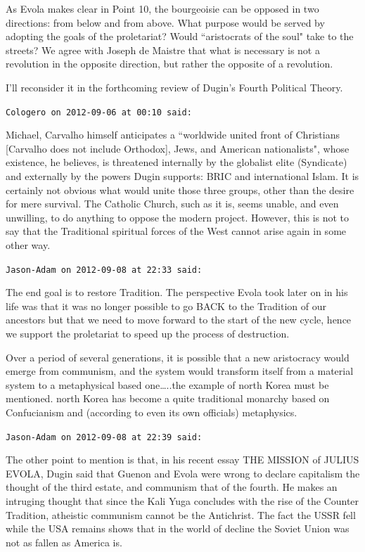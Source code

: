 \begin{footnotesize}
\begin{sffamily}
As Evola makes clear in Point 10, the bourgeoisie can be opposed in two directions: from below and from above. What purpose would be served by adopting the goals of the proletariat? Would ``aristocrats of the soul" take to the streets? We agree with Joseph de Maistre that what is necessary is not a revolution in the opposite direction, but rather the opposite of a revolution.

I'll reconsider it in the forthcoming review of Dugin's Fourth Political Theory.


\hfill

\texttt{Cologero on 2012-09-06 at 00:10 said: }

Michael, Carvalho himself anticipates a ``worldwide united front of Christians [Carvalho does not include Orthodox], Jews, and American nationalists", whose existence, he believes, is threatened internally by the globalist elite (Syndicate) and externally by the powers Dugin supports: BRIC and international Islam. It is certainly not obvious what would unite those three groups, other than the desire for mere survival. The Catholic Church, such as it is, seems unable, and even unwilling, to do anything to oppose the modern project. However, this is not to say that the Traditional spiritual forces of the West cannot arise again in some other way.


\hfill

\texttt{Jason-Adam on 2012-09-08 at 22:33 said: }

The end goal is to restore Tradition. The perspective Evola took later on in his life was that it was no longer possible to go BACK to the Tradition of our ancestors but that we need to move forward to the start of the new cycle, hence we support the proletariat to speed up the process of destruction.

Over a period of several generations, it is possible that a new aristocracy would emerge from communism, and the system would transform itself from a material system to a metaphysical based one…..the example of north Korea must be mentioned. north Korea has become a quite traditional monarchy based on Confucianism and (according to even its own officials) metaphysics.


\hfill

\texttt{Jason-Adam on 2012-09-08 at 22:39 said: }

The other point to mention is that, in his recent essay THE MISSION of JULIUS EVOLA, Dugin said that Guenon and Evola were wrong to declare capitalism the thought of the third estate, and communism that of the fourth. He makes an intruging thought that since the Kali Yuga concludes with the rise of the Counter Tradition, atheistic communism cannot be the Antichrist. The fact the USSR fell while the USA remains shows that in the world of decline the Soviet Union was not as fallen as America is.


\end{sffamily}
\end{footnotesize}

